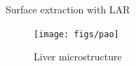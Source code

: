 \begin{frame}{Surface extraction with LAR}
\begin{figure}
    \centering
            \texttt{[image: figs/pao]}
    \caption{Liver microstructure\cite{Paoluzzi2016}}
    \label{fig:my_label}
\end{figure}
    
\end{frame}








